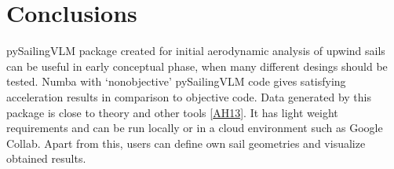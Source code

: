 \documentclass[letterpaper,10pt,english]{jupyterBook}
\begin{document}
\sphinxstepscope


\chapter{Conclusions}
\label{\detokenize{chapters/conclusion:conclusions}}\label{\detokenize{chapters/conclusion::doc}}
\sphinxAtStartPar
pySailingVLM package created for initial aerodynamic analysis of upwind sails can be useful in
early conceptual phase, when many different desings should be tested. Numba with ‘non\sphinxhyphen{}objective’ pySailingVLM code gives satisfying acceleration results in comparison to objective code. Data generated by this package is close to theory and other tools {[}\hyperlink{cite.chapters/bibliography:id3}{AH13}{]}. It has light weight requirements and can be run locally or in a cloud environment such as Google Collab. Apart from this, users can define own sail geometries and visualize obtained results.

\sphinxstepscope
\end{document}
